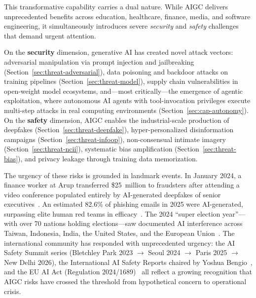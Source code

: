 
This transformative capability carries a dual nature. While AIGC delivers unprecedented benefits across education, healthcare, finance, media, and software engineering, it simultaneously introduces severe \emph{security} and \emph{safety} challenges that demand urgent attention.

On the \textbf{security} dimension, generative AI has created novel attack vectors: adversarial manipulation via prompt injection and jailbreaking (Section~\ref{sec:threat-adversarial}), data poisoning and backdoor attacks on training pipelines (Section~\ref{sec:threat-model}), supply chain vulnerabilities in open-weight model ecosystems, and---most critically---the emergence of agentic exploitation, where autonomous AI agents with tool-invocation privileges execute multi-step attacks in real computing environments (Section~\ref{sec:cap-autonomy}). On the \textbf{safety} dimension, AIGC enables the industrial-scale production of deepfakes (Section~\ref{sec:threat-deepfake}), hyper-personalized disinformation campaigns (Section~\ref{sec:threat-infoop}), non-consensual intimate imagery (Section~\ref{sec:threat-ncii}), systematic bias amplification (Section~\ref{sec:threat-bias}), and privacy leakage through training data memorization.

The urgency of these risks is grounded in landmark events. In January 2024, a finance worker at Arup transferred \$25~million to fraudsters after attending a video conference populated entirely by AI-generated deepfakes of senior executives~\cite{brightside2025phishing}. An estimated 82.6\% of phishing emails in 2025 were AI-generated, surpassing elite human red teams in efficacy~\cite{knowbe4_2025,hoxhunt2025}. The 2024 ``super election year''---with over 70 nations holding elections---saw documented AI interference across Taiwan, Indonesia, India, the United States, and the European Union~\cite{restofworld2024tracker}. The international community has responded with unprecedented urgency: the AI Safety Summit series (Bletchley Park 2023 $\to$ Seoul 2024 $\to$ Paris 2025 $\to$ New Delhi 2026), the International AI Safety Reports chaired by Yoshua Bengio~\cite{aisafetyreport2025,aisafetyreport2026}, and the EU AI Act (Regulation 2024/1689)~\cite{euaiact2024} all reflect a growing recognition that AIGC risks have crossed the threshold from hypothetical concern to operational crisis.


